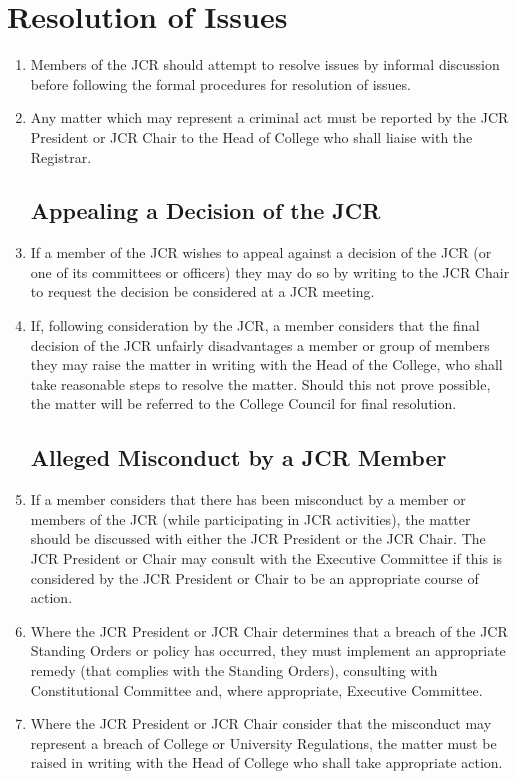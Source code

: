 \documentclass[12pt]{article}  %
\begin{document}
\section{Resolution of Issues}
\begin{enumerate}
    \item Members of the JCR should attempt to resolve issues by informal discussion before following the formal procedures for resolution of issues. 
    \item Any matter which may represent a criminal act must be reported by the JCR President or JCR Chair to the Head of College who shall liaise with the Registrar.
    \subsection*{Appealing a Decision of the JCR}
    \item If a member of the JCR wishes to appeal against a decision of the JCR (or one of its committees or officers) they may do so by writing to the JCR Chair to request the decision be considered at a JCR meeting.
    \item If, following consideration by the JCR, a member considers that the final decision of the JCR unfairly disadvantages a member or group of members they may raise the matter in writing with the Head of the College, who shall take reasonable steps to resolve the matter. Should this not prove possible, the matter will be referred to the College Council for final resolution.
    \subsection*{Alleged Misconduct by a JCR Member}
    \item If a member considers that there has been misconduct by a member or members of the JCR (while participating in JCR activities), the matter should be discussed with either the JCR President or the JCR Chair. The JCR President or Chair may consult with the Executive Committee if this is considered by the JCR President or Chair to be an appropriate course of action.
    \item Where the JCR President or JCR Chair determines that a breach of the JCR Standing Orders or policy has occurred, they must implement an appropriate remedy (that complies with the Standing Orders), consulting with Constitutional Committee and, where appropriate, Executive Committee.
    \item Where the JCR President or JCR Chair consider that the misconduct may represent a breach of College or University Regulations, the matter must be raised in writing with the Head of College who shall take appropriate action.
\end{enumerate}
\end{document}
